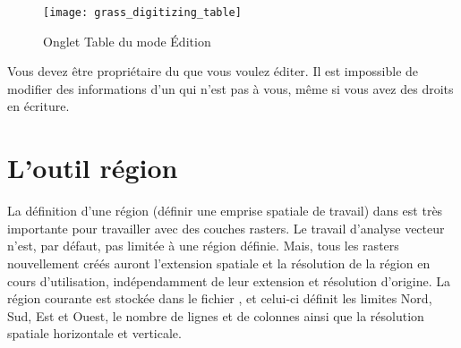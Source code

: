 {\begin{figure}[ht]
 \begin{center}
 \texttt{[image: grass\_digitizing\_table]}
  \caption{Onglet Table du mode Édition \grass \nixcaption}\label{fig:grass_digitizing_table}
 \end{center}
\end{figure}

\begin{Tip}\caption{\textsc{Éditer les permissions \grass}}
Vous devez être propriétaire du  que vous voulez éditer. Il est impossible de modifier des informations d'un  qui n'est pas à vous, même si vous avez des droits en écriture.
\end{Tip} 

\section{L'outil région \grass}\label{sec:grass_region}


La définition d'une région (définir une emprise spatiale de travail) dans \grass est très importante pour travailler avec des couches rasters. Le travail d'analyse vecteur n'est, par défaut, pas limitée à une région définie. Mais, tous les rasters nouvellement créés auront l'extension spatiale et la résolution de la région \grass en cours d'utilisation, indépendamment de leur extension et résolution d'origine. La région courante \grass est stockée dans le fichier , et celui-ci définit les limites Nord, Sud, Est et Ouest, le nombre de lignes et de colonnes ainsi que la résolution spatiale horizontale et verticale.

}
